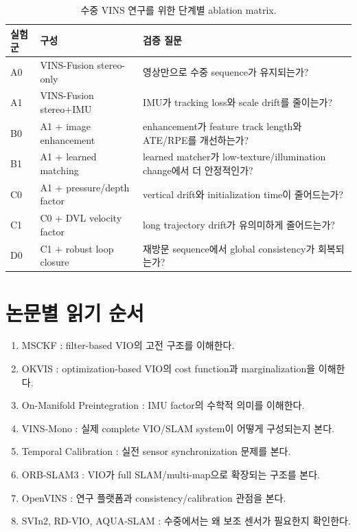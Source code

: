 \documentclass[11pt,a4paper]{article}
\begin{document}
\begin{table}[htbp]
\centering
\small
\begin{tabularx}{\linewidth}{p{26mm}p{35mm}Y}
\toprule
\textbf{실험군} & \textbf{구성} & \textbf{검증 질문} \\
\midrule
A0 & VINS-Fusion stereo-only & 영상만으로 수중 sequence가 유지되는가? \\
A1 & VINS-Fusion stereo+IMU & IMU가 tracking loss와 scale drift를 줄이는가? \\
B0 & A1 + image enhancement & enhancement가 feature track length와 ATE/RPE를 개선하는가? \\
B1 & A1 + learned matching & learned matcher가 low-texture/illumination change에서 더 안정적인가? \\
C0 & A1 + pressure/depth factor & vertical drift와 initialization time이 줄어드는가? \\
C1 & C0 + DVL velocity factor & long trajectory drift가 유의미하게 줄어드는가? \\
D0 & C1 + robust loop closure & 재방문 sequence에서 global consistency가 회복되는가? \\
\bottomrule
\end{tabularx}
\caption{수중 VINS 연구를 위한 단계별 ablation matrix.}
\end{table}

\section{논문별 읽기 순서}

\begin{enumerate}
  \item MSCKF \cite{mourikis2007msckf}: filter-based VIO의 고전 구조를 이해한다.
  \item OKVIS \cite{leutenegger2015okvis}: optimization-based VIO의 cost function과 marginalization을 이해한다.
  \item On-Manifold Preintegration \cite{forster2017preintegration}: IMU factor의 수학적 의미를 이해한다.
  \item VINS-Mono \cite{qin2018vinsmono}: 실제 complete VIO/SLAM system이 어떻게 구성되는지 본다.
  \item Temporal Calibration \cite{qin2018temporal}: 실전 sensor synchronization 문제를 본다.
  \item ORB-SLAM3 \cite{campos2021orbslam3}: VIO가 full SLAM/multi-map으로 확장되는 구조를 본다.
  \item OpenVINS \cite{geneva2020openvins}: 연구 플랫폼과 consistency/calibration 관점을 본다.
  \item SVIn2, RD-VIO, AQUA-SLAM \cite{rahman2022svin2,li2023rdvio,xu2025aquaslam}: 수중에서는 왜 보조 센서가 필요한지 확인한다.
\end{enumerate}
\end{document}
